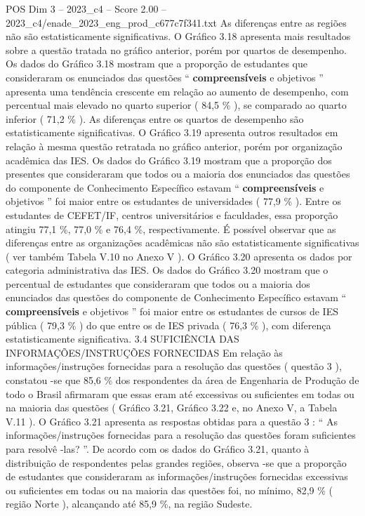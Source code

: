 \begin{textsample}{POS Dim 3 – 2023\_c4 – Score 2.00 – 2023\_c4/enade\_2023\_eng\_prod\_c677c7f341.txt}
As diferenças entre as regiões não são estatisticamente significativas.
O Gráfico 3.18 apresenta mais resultados sobre a questão tratada no gráfico anterior, porém por quartos de desempenho.
Os dados do Gráfico 3.18 mostram que a proporção de estudantes que consideraram os enunciados das questões “ \textbf{compreensíveis} e objetivos ” apresenta uma tendência crescente em relação ao aumento de desempenho, com percentual mais elevado no quarto superior ( 84,5 \% ), se comparado ao quarto inferior ( 71,2 \% ).
As diferenças entre os quartos de desempenho são estatisticamente significativas.
O Gráfico 3.19 apresenta outros resultados em relação à mesma questão retratada no gráfico anterior, porém por organização acadêmica das IES.
Os dados do Gráfico 3.19 mostram que a proporção dos presentes que consideraram que todos ou a maioria dos enunciados das questões do componente de Conhecimento Específico estavam “ \textbf{compreensíveis} e objetivos ” foi maior entre os estudantes de universidades ( 77,9 \% ).
Entre os estudantes de CEFET/IF, centros universitários e faculdades, essa proporção atingiu 77,1 \%, 77,0 \% e 76,4 \%, respectivamente.
É possível observar que as diferenças entre as organizações acadêmicas não são estatisticamente significativas ( ver também Tabela V.10 no Anexo V ).
O Gráfico 3.20 apresenta os dados por categoria administrativa das IES.
Os dados do Gráfico 3.20 mostram que o percentual de estudantes que consideraram que todos ou a maioria dos enunciados das questões do componente de Conhecimento Específico estavam “ \textbf{compreensíveis} e objetivos ” foi maior entre os estudantes de cursos de IES pública ( 79,3 \% ) do que entre os de IES privada ( 76,3 \% ), com diferença estatisticamente significativa. 3.4 SUFICIÊNCIA DAS INFORMAÇÕES/INSTRUÇÕES FORNECIDAS Em relação às informações/instruções fornecidas para a resolução das questões ( questão 3 ), constatou -se que 85,6 \% dos respondentes da área de Engenharia de Produção de todo o Brasil afirmaram que essas eram até excessivas ou suficientes em todas ou na maioria das questões ( Gráfico 3.21, Gráfico 3.22 e, no Anexo V, a Tabela V.11 ).
O Gráfico 3.21 apresenta as respostas obtidas para a questão 3 : “ As informações/instruções fornecidas para a resolução das questões foram suficientes para resolvê -las? ”.
De acordo com os dados do Gráfico 3.21, quanto à distribuição de respondentes pelas grandes regiões, observa -se que a proporção de estudantes que consideraram as informações/instruções fornecidas excessivas ou suficientes em todas ou na maioria das questões foi, no mínimo, 82,9 \% ( região Norte ), alcançando até 85,9 \%, na região Sudeste.

\end{textsample}
